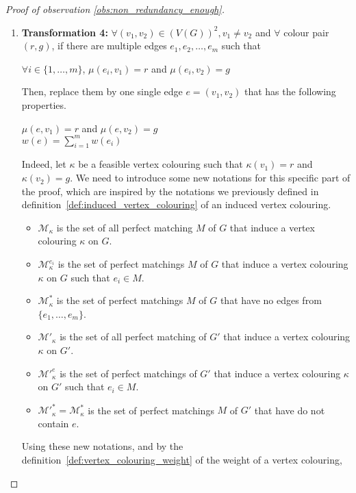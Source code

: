 \begin{proof}[Proof of observation \ref{obs:non_redundancy_enough}]
\begin{enumerate}
        \item \textbf{Transformation 4:} $\forall (v_1, v_2) \in (V(G))^2, v_1 \neq v_2$ and $\forall$ colour pair $(r, g)$, if there are multiple edges $e_1, e_2, \dots, e_m$ such that
            \begin{center}
                $\forall i \in \{1, \dots, m\}$, $\mu(e_i, v_1) = r$ and $\mu(e_i, v_2) = g$
            \end{center}
            Then, replace them by one single edge $e = (v_1, v_2)$ that has the following properties.
            \begin{center}
                $\mu(e, v_1) = r$ and $\mu(e, v_2) = g$ \\
                $w(e) = \sum\limits_{i = 1}^m w(e_i)$
            \end{center}

            Indeed, let $\kappa$ be a feasible vertex colouring such that $\kappa(v_1) = r$ and $\kappa(v_2) = g$.
            We need to introduce some new notations for this specific part of the proof, which are inspired by the notations we previously defined in definition~\ref{def:induced_vertex_colouring} of an induced vertex colouring.

            \begin{itemize}
                \item $\mathcal{M}_\kappa$ is the set of all perfect matching $M$ of $G$ that induce a vertex colouring $\kappa$ on $G$.
                \item $\mathcal{M}_\kappa^{e_i}$ is the set of perfect matchings $M$ of $G$ that induce a vertex colouring $\kappa$ on $G$ such that $e_i \in M$.
                \item $\mathcal{M}_\kappa^{*}$ is the set of perfect matchings $M$ of $G$ that have no edges from $\{e_1, \dots, e_m\}$.
                \item $\mathcal{M'}_\kappa$ is the set of all perfect matching of $G'$ that induce a vertex colouring $\kappa$ on $G'$.
                \item $\mathcal{M'}_\kappa^{e}$ is the set of perfect matchings of $G'$ that induce a vertex colouring $\kappa$ on $G'$ such that $e_i \in M$.
                \item $\mathcal{M'}_\kappa^{*} = \mathcal{M}_\kappa^{*}$ is the set of perfect matchings $M$ of $G'$ that have do not contain $e$.
            \end{itemize}

            Using these new notations, and by the definition~\ref{def:vertex_colouring_weight} of the weight of a vertex colouring,


\end{enumerate}
\end{proof}
